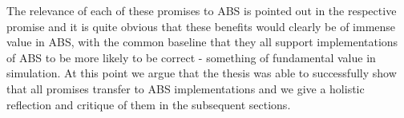 The relevance of each of these promises to ABS is pointed out in the respective promise and it is quite obvious that these benefits would clearly be of immense value in ABS, with the common baseline that they all support implementations of ABS to be more likely to be correct - something of fundamental value in simulation. At this point we argue that the thesis was able to successfully show that all promises transfer to ABS implementations and we give a holistic reflection and critique of them in the subsequent sections.












